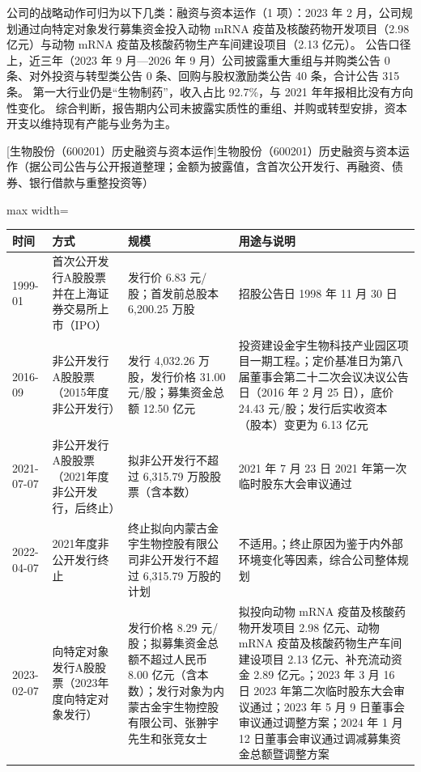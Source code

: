  公司的战略动作可归为以下几类：融资与资本运作（1 项）：2023 年 2 月，公司规划通过向特定对象发行募集资金投入动物 mRNA 疫苗及核酸药物开发项目（2.98 亿元）与动物 mRNA 疫苗及核酸药物生产车间建设项目（2.13 亿元）。 公告口径上，近三年（2023 年 9 月---2026 年 9 月）公司披露重大重组与并购类公告 0 条、对外投资与转型类公告 0 条、回购与股权激励类公告 40 条，合计公告 315 条。 第一大行业仍是“生物制药”，收入占比 92.7\%，与 2021 年年报相比没有方向性变化。 综合判断，报告期内公司未披露实质性的重组、并购或转型安排，资本开支以维持现有产能与业务为主。

\begin{center}\small\setlength{\tabcolsep}{4pt}
[生物股份（600201）历史融资与资本运作]{生物股份（600201）历史融资与资本运作（据公司公告与公开报道整理；金额为披露值，含首次公开发行、再融资、债券、银行借款与重整投资等）}
\begin{adjustbox}{max width=\textwidth}
\begin{tabular}{@{}p{1.45cm}p{2.55cm}p{4.05cm}p{4.95cm}@{}}
\toprule
时间 & 方式 & 规模 & 用途与说明 \\
\midrule
1999-01 & 首次公开发行A股股票并在上海证券交易所上市（IPO） & 发行价 6.83 元/\allowbreak{}股；首发前总股本 6,\allowbreak{}200.25 万股 & 招股公告日 1998 年 11 月 30 日 \\
2016-09 & 非公开发行A股股票（2015年度非公开发行） & 发行 4,\allowbreak{}032.26 万股，\allowbreak{}发行价格 31.00 元/\allowbreak{}股；募集资金总额 12.50 亿元 & 投资建设金宇生物科技产业园区项目一期工程。；定价基准日为第八届董事会第二十二次会议决议公告日（2016 年 2 月 25 日），\allowbreak{}底价 24.43 元/\allowbreak{}股；发行后实收资本（股本）变更为 6.13 亿元 \\
2021-07-07 & 非公开发行A股股票（2021年度非公开发行，后终止） & 拟非公开发行不超过 6,\allowbreak{}315.79 万股股票（含本数） & 2021 年 7 月 23 日 2021 年第一次临时股东大会审议通过 \\
2022-04-07 & 2021年度非公开发行终止 & 终止拟向内蒙古金宇生物控股有限公司非公开发行不超过 6,\allowbreak{}315.79 万股的计划 & 不适用。；终止原因为鉴于内外部环境变化等因素，\allowbreak{}综合公司整体规划 \\
2023-02-07 & 向特定对象发行A股股票（2023年度向特定对象发行） & 发行价格 8.29 元/\allowbreak{}股；拟募集资金总额不超过人民币 8.00 亿元（含本数）；发行对象为内蒙古金宇生物控股有限公司、\allowbreak{}张翀宇先生和张竞女士 & 拟投向动物 mRNA 疫苗及核酸药物开发项目 2.98 亿元、\allowbreak{}动物 mRNA 疫苗及核酸药物生产车间建设项目 2.13 亿元、\allowbreak{}补充流动资金 2.89 亿元。；2023 年 3 月 16 日 2023 年第二次临时股东大会审议通过；2023 年 5 月 9 日董事会审议通过调整方案；2024 年 1 月 12 日董事会审议通过调减募集资金总额暨调整方案 \\

\end{tabular}
\end{adjustbox}
\end{center}
